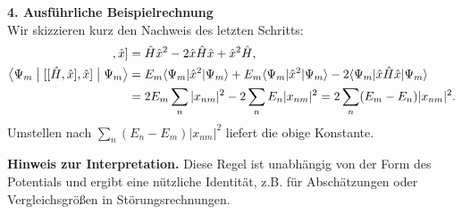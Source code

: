 \documentclass[12pt]{scrartcl}
\begin{document}
\textbf{4. Ausführliche Beispielrechnung}\\
Wir skizzieren kurz den Nachweis des letzten Schritts:
\begin{align*}
  [[\hat H,\hat x],\hat x]
  &= \hat H\hat x^2 - 2\hat x\hat H\hat x + \hat x^2\hat H, \\
  \bigl\langle \Psi_m \bigm|[[\hat H,\hat x],\hat x]\bigm| \Psi_m \bigr\rangle
  &= E_m\langle \Psi_m|\hat x^2|\Psi_m\rangle + E_m\langle \Psi_m|\hat x^2|\Psi_m\rangle
     -2\langle \Psi_m|\hat x\hat H\hat x|\Psi_m\rangle \\
  &= 2E_m\sum_n |x_{nm}|^2 -2\sum_n E_n|x_{nm}|^2
   = 2\sum_n (E_m-E_n)|x_{nm}|^2.
\end{align*}
Umstellen nach $\sum_n(E_n-E_m)|x_{nm}|^2$ liefert die obige Konstante.

\textbf{Hinweis zur Interpretation.} Diese Regel ist unabhängig von der Form des Potentials und ergibt eine nützliche
Identität, z.B. für Abschätzungen oder Vergleichsgrößen in Störungsrechnungen.
\end{document}
